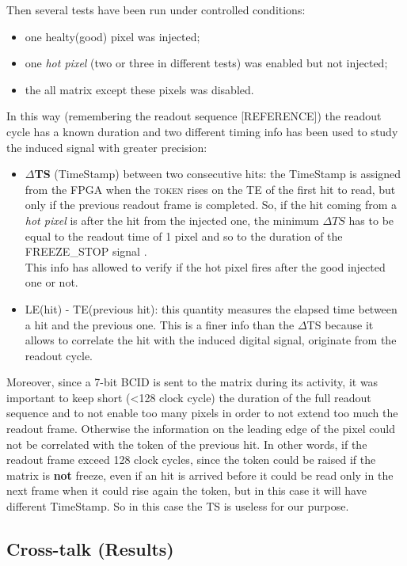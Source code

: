Then several tests have been run under controlled conditions:
\begin{itemize}
\item one healty(good) pixel was injected;
\item one \textit{hot pixel} (two or three in different tests) was enabled but not injected;
\item the all matrix except these pixels was disabled.
\end{itemize}

In this way (remembering the readout sequence [REFERENCE]) the readout cycle has a known duration and two different timing info has been used to study the induced signal with greater precision:

\begin{itemize}
\item \textbf{$\Delta$TS} (TimeStamp) between two consecutive hits: the TimeStamp is assigned from the FPGA when the \textsc{token} rises on the TE of the first hit to read, but only if the previous readout frame is completed. So, if the hit coming from a \textit{hot pixel} is after the hit from the injected one, the minimum $\Delta TS$ has to be equal to the readout time of 1 pixel and so to the duration of the \textsc{FREEZE\_STOP} signal .\\
This info has allowed to verify if the hot pixel fires after the good injected one or not.
\item LE(hit) - TE(previous hit): this quantity measures the elapsed time between a hit and the previous one. This is a finer info than the $\Delta$TS because it allows to correlate the hit with the induced digital signal, originate from the readout cycle.
\end{itemize}

Moreover, since a 7-bit BCID is sent to the matrix during its activity, it was important to keep short (<128 clock cycle) the duration of the full readout sequence and to not enable too many pixels in order to not extend too much the readout frame. Otherwise the information on the leading edge of the pixel could not be correlated with the token of the previous hit. In other words, if the readout frame exceed 128 clock cycles, since the token could be raised if the matrix is \textbf{not} freeze, even if an hit is arrived before it could be read only in the next frame when it could rise again the token, but in this case it will have different TimeStamp. So in this case the TS is useless for our purpose.


\subsection{Cross-talk (Results)}

